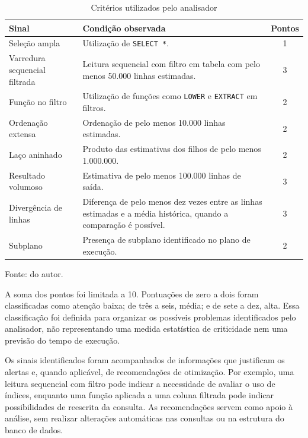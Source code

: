 \documentclass{UNESC}
\newcommand{\codigo}[1]{\texttt{#1}}
\begin{document}
\begin{table}[H]
\centering
\caption{Critérios utilizados pelo analisador}
\label{tab:regras}

\begin{minipage}{\textwidth}
\footnotesize
\begin{tabularx}{\linewidth}{Y Y c}
\toprule
\textbf{Sinal} & \textbf{Condição observada} & \textbf{Pontos} \\
\midrule
Seleção ampla & Utilização de \codigo{SELECT *}. & 1 \\
Varredura sequencial filtrada & Leitura sequencial com filtro em tabela com pelo menos 50.000 linhas estimadas. & 3 \\
Função no filtro & Utilização de funções como \codigo{LOWER} e \codigo{EXTRACT} em filtros. & 2 \\
Ordenação extensa & Ordenação de pelo menos 10.000 linhas estimadas. & 2 \\
Laço aninhado & Produto das estimativas dos filhos de pelo menos 1.000.000. & 2 \\
Resultado volumoso & Estimativa de pelo menos 100.000 linhas de saída. & 3 \\
Divergência de linhas & Diferença de pelo menos dez vezes entre as linhas estimadas e a média histórica, quando a comparação é possível. & 3 \\
Subplano & Presença de subplano identificado no plano de execução. & 2 \\
\bottomrule
\end{tabularx}

\vspace{0.2cm}
{\raggedright\footnotesize Fonte: do autor.\par}
\end{minipage}
\end{table}

A soma dos pontos foi limitada a 10. Pontuações de zero a dois foram classificadas como atenção baixa; de três a seis, média; e de sete a dez, alta. Essa classificação foi definida para organizar os possíveis problemas identificados pelo analisador, não representando uma medida estatística de criticidade nem uma previsão do tempo de execução.

Os sinais identificados foram acompanhados de informações que justificam os alertas e, quando aplicável, de recomendações de otimização. Por exemplo, uma leitura sequencial com filtro pode indicar a necessidade de avaliar o uso de índices, enquanto uma função aplicada a uma coluna filtrada pode indicar possibilidades de reescrita da consulta. As recomendações servem como apoio à análise, sem realizar alterações automáticas nas consultas ou na estrutura do banco de dados.
\end{document}
